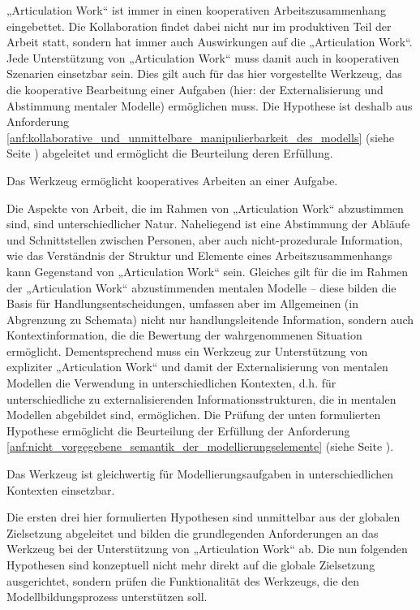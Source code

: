 „Articulation Work“ ist immer in einen kooperativen Arbeitszusammenhang eingebettet. Die Kollaboration findet dabei nicht nur im produktiven Teil der Arbeit statt, sondern hat immer auch Auswirkungen auf die „Articulation Work“. Jede Unterstützung von „Articulation Work“ muss damit auch in kooperativen Szenarien einsetzbar sein. Dies gilt auch für das hier vorgestellte Werkzeug, das die kooperative Bearbeitung einer Aufgaben (hier: der Externalisierung und Abstimmung mentaler Modelle) ermöglichen muss. Die Hypothese ist deshalb aus Anforderung \ref{anf:kollaborative_und_unmittelbare_manipulierbarkeit_des_modells} (siehe Seite \pageref{anf:kollaborative_und_unmittelbare_manipulierbarkeit_des_modells}) abgeleitet und ermöglicht die Beurteilung deren Erfüllung.

\begin{hyp}
	\label{hyp:kollaborativ}
	Das Werkzeug ermöglicht kooperatives Arbeiten an einer Aufgabe.
\end{hyp}

Die Aspekte von Arbeit, die im Rahmen von „Articulation Work“ abzustimmen sind, sind unterschiedlicher Natur. Naheliegend ist eine Abstimmung der Abläufe und Schnittstellen zwischen Personen, aber auch nicht-prozedurale Information, wie das Verständnis der Struktur und Elemente eines Arbeitszusammenhangs kann Gegenstand von „Articulation Work“ sein. Gleiches gilt für die im Rahmen der „Articulation Work“ abzustimmenden mentalen Modelle -- diese bilden die Basis für Handlungsentscheidungen, umfassen aber im Allgemeinen (in Abgrenzung zu Schemata) nicht nur handlungsleitende Information, sondern auch Kontextinformation, die die Bewertung der wahrgenommenen Situation ermöglicht. Dementsprechend muss ein Werkzeug zur Unterstützung von expliziter „Articulation Work“ und damit der Externalisierung von mentalen Modellen die Verwendung in unterschiedlichen Kontexten, d.h. für unterschiedliche zu externalisierenden Informationsstrukturen, die in mentalen Modellen abgebildet sind, ermöglichen. Die Prüfung der unten formulierten Hypothese ermöglicht die Beurteilung der Erfüllung der Anforderung \ref{anf:nicht_vorgegebene_semantik_der_modellierungselemente} (siehe Seite \pageref{anf:nicht_vorgegebene_semantik_der_modellierungselemente}).

\begin{hyp}
	\label{hyp:kontexte}
	Das Werkzeug ist gleichwertig für Modellierungsaufgaben in unterschiedlichen Kontexten einsetzbar.
\end{hyp}

Die ersten drei hier formulierten Hypothesen sind unmittelbar aus der globalen Zielsetzung abgeleitet und bilden die grundlegenden Anforderungen an das Werkzeug bei der Unterstützung von „Articulation Work“ ab. Die nun folgenden Hypothesen sind konzeptuell nicht mehr direkt auf die globale Zielsetzung ausgerichtet, sondern prüfen die Funktionalität des Werkzeugs, die den Modellbildungsprozess unterstützen soll. 


